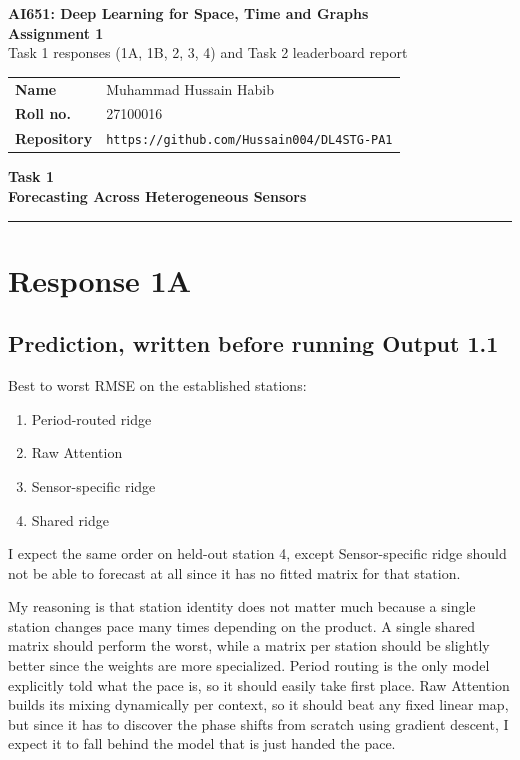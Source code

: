 \documentclass[11pt,letterpaper]{article}
\newcommand{\taskbanner}[2]{\begin{center}{\small\bfseries #1}\\[3pt]{\Large\bfseries #2}\end{center}\vspace{2pt}\hrule\vspace{8pt}}
\begin{document}
\begin{center}
  {\small\bfseries AI651: Deep Learning for Space, Time and Graphs}\\[6pt]
  {\Large\bfseries Assignment 1}\\[6pt]
  {\small Task 1 responses (1A, 1B, 2, 3, 4) and Task 2 leaderboard report}
\end{center}

\vspace{2pt}
\noindent\begin{tabular}{@{}p{0.8in}p{5.6in}@{}}
\textbf{Name}      & Muhammad Hussain Habib \\
\textbf{Roll no.}  & 27100016 \\
\textbf{Repository} & \texttt{https://github.com/Hussain004/DL4STG-PA1} \\
\end{tabular}

\vspace{6pt}
\normalsize

\taskbanner{Task 1}{Forecasting Across Heterogeneous Sensors}


\section*{Response 1A}

\subsection*{Prediction, written before running Output 1.1}

Best to worst RMSE on the established stations: 

\begin{enumerate}
    \item Period-routed ridge
    \item Raw Attention
    \item Sensor-specific ridge
    \item Shared ridge
\end{enumerate}

I expect the same order on held-out station 4, except Sensor-specific ridge should not be able to forecast at all since it has no fitted matrix for that station.

My reasoning is that station identity does not matter much because a single station changes pace many times depending on the product. A single shared matrix should perform the worst, while a matrix per station should be slightly better since the weights are more specialized. Period routing is the only model explicitly told what the pace is, so it should easily take first place. Raw Attention builds its mixing dynamically per context, so it should beat any fixed linear map, but since it has to discover the phase shifts from scratch using gradient descent, I expect it to fall behind the model that is just handed the pace.
\end{document}
